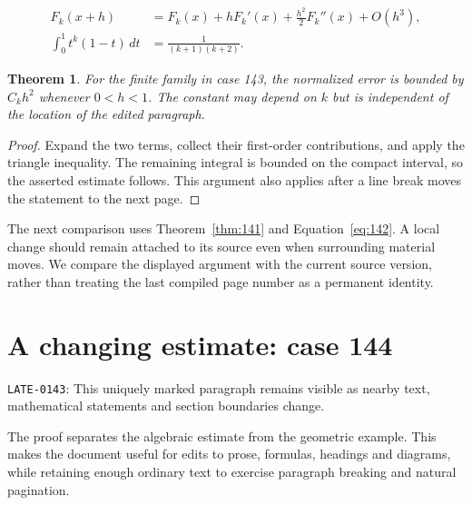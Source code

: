 \documentclass[a4paper,10pt]{article}
\newtheorem{theorem}{Theorem}[section]
\begin{document}
\lipsum[7-8]
\begin{align}\label{eq:142}
 F_k(x+h)&=F_k(x)+hF_k'(x)+\frac{h^2}{2}F_k''(x)+O(h^3),\\
 \int_0^1 t^k(1-t)\,dt&=\frac{1}{(k+1)(k+2)}.
\end{align}
\begin{theorem}\label{thm:142}
For the finite family in case 143, the normalized error is bounded by $C_k h^2$ whenever $0<h<1$. The constant may depend on $k$ but is independent of the location of the edited paragraph.
\end{theorem}
\begin{proof}
Expand the two terms, collect their first-order contributions, and apply the
triangle inequality. The remaining integral is bounded on the compact interval,
so the asserted estimate follows. This argument also applies after a line break
moves the statement to the next page.
\end{proof}
The next comparison uses Theorem~\ref{thm:141} and Equation~\ref{eq:142}. A local change should remain attached to its source even when surrounding material moves. We compare the displayed argument with the current source version, rather than treating the last compiled page number as a permanent identity.

\lipsum[13]

\section{A changing estimate: case 144}\label{unit:143}
\hypertarget{varied:late}{}\label{anchor:late}
\noindent \texttt{LATE-0143}: This uniquely marked paragraph remains visible as nearby text, mathematical statements and section boundaries change.

The proof separates the algebraic estimate from the geometric example. This makes the document useful for edits to prose, formulas, headings and diagrams, while retaining enough ordinary text to exercise paragraph breaking and natural pagination.
\end{document}
